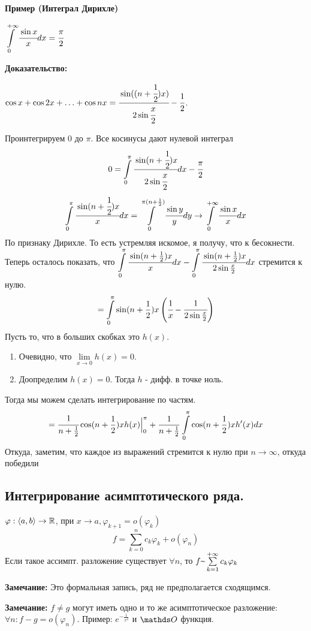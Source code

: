 \textbf{Пример (Интеграл Дирихле)}

$\displaystyle\int\limits_{0}^{+\infty}\cfrac{\sin x}{x}dx  =\cfrac{\pi}{2}$

\textbf{Доказательство:}

$\cos x + \cos 2x + \ldots + \cos nx = \cfrac{\sin ((n+\cfrac{1}{2})x)}{2\sin \cfrac{x}{2}}-\cfrac{1}{2}$.

Проинтегрируем $0$ до $\pi$. Все косинусы дают нулевой интеграл
$$0=\displaystyle\int\limits_{0}^{\pi}\cfrac{\sin (n+\cfrac{1}{2})x}{2\sin\cfrac{x}{2}}dx - \cfrac{\pi}{2}$$
$$\displaystyle\int\limits_{0}^{\pi}\cfrac{\sin (n+\cfrac{1}{2})x}{x}dx = \displaystyle\int\limits_{0}^{\pi(n+\frac{1}{2})}\cfrac{\sin y}{y}dy \rightarrow \displaystyle\int\limits_{0}^{+\infty}\cfrac{\sin x}{x}dx$$
По признаку Дирихле. То есть устремляя искомое, я получу, что к бесокнести. Теперь осталось показать, что $\displaystyle\int\limits_{0}^{\pi} \cfrac{\sin (n+ \frac{1}{2} )x}{x}dx - \displaystyle\int\limits_{0}^{\pi}\cfrac{\sin(n+\frac{1}{2})x}{2\sin \frac{x}{2}}dx$ стремится к нулю.
$$=\displaystyle\int\limits_{0}^{\pi}\sin (n + \frac{1}{2})x \left( \cfrac{1}{x} - \cfrac{1}{2 \sin \frac{x}{2}}\right)$$
Пусть то, что в больших скобках это $h(x)$. 
\begin{enumerate}
    \item Очевидно, что $\lim\limits_{x\rightarrow0}h(x) = 0$. 
    \item Доопределим $h(x) = 0$. Тогда $h$ - дифф. в точке ноль.
\end{enumerate}
Тогда мы можем сделать интегрирование по частям.
$$=\cfrac{1}{n + \frac{1}{2}}\cos (n + \frac{1}{2})x h(x) \Big|^\pi_0 + \frac{1}{n + \frac{1}{2}}\displaystyle\int\limits_{0}^{\pi}\cos (n + \frac{1}{2})x h'(x) dx$$
Откуда, заметим, что каждое из выражений стремится к нулю при $n\rightarrow \infty$, откуда победили


\pagebreak
\subsection{Интегрирование асимптотического ряда.}

$\varphi: \langle a,b\rangle \rightarrow \mathbb{R}$, при $x \rightarrow a, \varphi_{k+1} = o(\varphi_k)$
$$f = \sum\limits_{k=0}^n c_k \varphi_k + o(\varphi_n)$$
Если такое ассимпт. разложение существует $\forall n$, то $f \mytilde \sum\limits_{k=1}^{+\infty}c_k \varphi_k$

\textbf{Замечание:} Это формальная запись, ряд не предполагается сходящимся.

\textbf{Замечание:} $f \neq g$ могут иметь одно и то же асимптотическое разложение: $\forall n: f-g = o(\varphi_n)$. Пример: $e^{-\frac{1}{x^2}}$ и $\zero$ функция.

